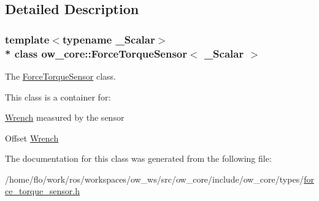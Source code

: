 \subsection{Detailed Description}
\subsubsection*{template$<$typename \+\_\+\+Scalar$>$\\*
class ow\+\_\+core\+::\+Force\+Torque\+Sensor$<$ \+\_\+\+Scalar $>$}

The \hyperlink{classow__core_1_1ForceTorqueSensor}{Force\+Torque\+Sensor} class. 

This class is a container for\+:
\begin{DoxyItemize}
\item \hyperlink{classow__core_1_1Wrench}{Wrench} measured by the sensor
\item Offset \hyperlink{classow__core_1_1Wrench}{Wrench} 
\end{DoxyItemize}

The documentation for this class was generated from the following file\+:\begin{DoxyCompactItemize}
\item 
/home/flo/work/ros/workspaces/ow\+\_\+ws/src/ow\+\_\+core/include/ow\+\_\+core/types/\hyperlink{force__torque__sensor_8h}{force\+\_\+torque\+\_\+sensor.\+h}\end{DoxyCompactItemize}
